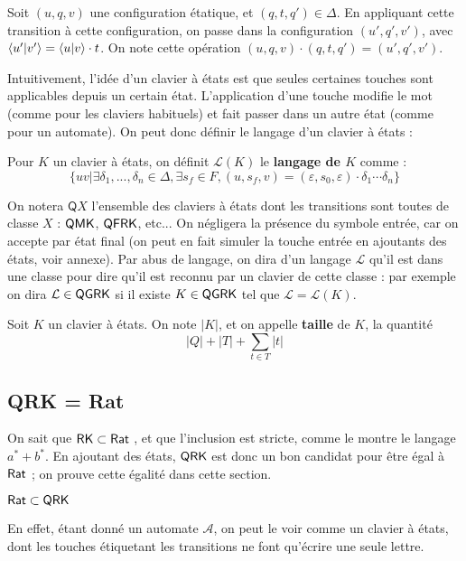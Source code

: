 \documentclass[12pt, a4paper]{article}
\renewcommand{\L}{\mathcal{L}}
\newcommand{\A}{\mathcal{A}}
\begin{document}
    Soit $(u,q,v)$ une configuration étatique, et $(q,t,q') \in \Delta$. En appliquant cette transition à cette configuration, on passe dans la configuration $(u',q',v')$, avec $\left\langle u' \middle| v' \right\rangle = \left\langle u \middle| v \right\rangle \cdot t$.
    On note cette opération $(u,q,v) \cdot (q,t,q') = (u',q',v')$.

    Intuitivement, l'idée d'un clavier à états est que seules certaines touches sont applicables depuis un certain état. L'application d'une touche modifie le mot (comme pour les claviers habituels)
    et fait passer dans un autre état (comme pour un automate).
    On peut donc définir le langage d'un clavier à états :

    Pour $K$ un clavier à états, on définit $\L(K)$ le \textbf{langage de $K$} comme :
    \[ \{uv | \exists\delta_1,...,\delta_n \in \Delta, \exists s_f \in F, (u,s_f,v) = (\varepsilon,s_0,\varepsilon)\cdot\delta_1\cdots\delta_n \}\]

    On notera $\mathsf{Q}X$ l'ensemble des claviers à états dont les transitions sont toutes de classe $X$ : $\mathsf{QMK}$, $\mathsf{QFRK}$, etc... 
    On négligera la présence du symbole entrée, car on accepte par état final (on peut en fait simuler la touche entrée en ajoutants des états, voir annexe).
    Par abus de langage, on dira d'un langage $\L$ qu'il est dans une classe pour dire qu'il est reconnu par un clavier de cette classe : 
    par exemple on dira $\L \in \QGRK$ si il existe $K \in \mathsf{QGRK}$ tel que $\L = \L(K)$.
    \begin{tailleclavierQ}
        Soit $K$ un clavier à états. On note $|K|$, et on appelle \textbf{taille} de $K$, la quantité 
        \[ |Q| + |T| + \sum_{t \in T} |t|\]
    \end{tailleclavierQ}

    \subsection{QRK = Rat}\label{sectionclavetats}
    On sait que $\mathsf{RK} \subset \mathsf{Rat}$ \autocite[théorèmes~101/102]{bible}, et que l'inclusion est stricte, comme le montre le langage $a^* + b^*$. En ajoutant des états,
    $\mathsf{QRK}$ est donc un bon candidat pour être égal à $\mathsf{Rat}$ ; on prouve cette égalité dans cette section.
    
    \begin{RatdansQRK}
        $\mathsf{Rat} \subset \mathsf{QRK}$
    \end{RatdansQRK}
    En effet, étant donné un automate $\A$, on peut le voir comme un clavier à états, dont les touches étiquetant les transitions 
    ne font qu'écrire une seule lettre.
    \medskip
\end{document}
